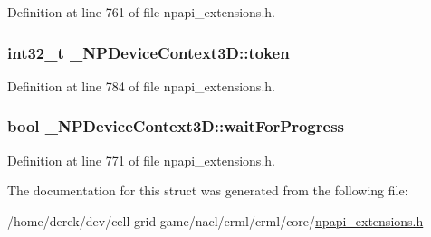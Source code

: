 Definition at line 761 of file npapi\_\-extensions.h.

\hypertarget{struct___n_p_device_context3_d_a830ebfce87462205435ee2330f95b587}{
\subsubsection[{token}]{\setlength{\rightskip}{0pt plus 5cm}int32\_\-t {\bf \_\-NPDeviceContext3D::token}}}
\label{struct___n_p_device_context3_d_a830ebfce87462205435ee2330f95b587}


Definition at line 784 of file npapi\_\-extensions.h.

\hypertarget{struct___n_p_device_context3_d_a652fa21fe68686fa83e81530d53e113e}{
\subsubsection[{waitForProgress}]{\setlength{\rightskip}{0pt plus 5cm}bool {\bf \_\-NPDeviceContext3D::waitForProgress}}}
\label{struct___n_p_device_context3_d_a652fa21fe68686fa83e81530d53e113e}


Definition at line 771 of file npapi\_\-extensions.h.



The documentation for this struct was generated from the following file:\begin{DoxyCompactItemize}
\item 
/home/derek/dev/cell-\/grid-\/game/nacl/crml/crml/core/\hyperlink{npapi__extensions_8h}{npapi\_\-extensions.h}\end{DoxyCompactItemize}
